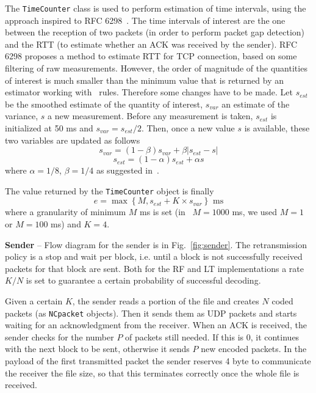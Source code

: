 The \texttt{TimeCounter} class is used to perform estimation of time intervals, using the approach inspired to RFC 6298~\cite{rfc6298}. The time intervals of interest are the one between the reception of two packets (in order to perform packet gap detection) and the RTT (to estimate whether an ACK was received by the sender). RFC 6298 proposes a method to estimate RTT for TCP connection, based on some filtering of raw measurements. However, the order of magnitude of the quantities of interest is much smaller than the minimum value that is returned by an estimator working with~\cite{rfc6298} rules. Therefore some changes have to be made. Let $s_{est}$ be the smoothed estimate of the quantity of interest, $s_{var}$ an estimate of the variance, $s$ a new measurement. Before any measurement is taken, $s_{est}$ is initialized at 50 ms and $s_{var} = s_{est}/2$. Then, once a new value $s$ is available, these two variables are updated as follows
\begin{equation}
	s_{var} = (1-\beta) s_{var}  + \beta |s_{est} - s|
\end{equation}
\begin{equation}
	s_{est} = (1 - \alpha) s_{est} + \alpha s
\end{equation}
where $\alpha = 1/8$, $\beta = 1/4$ as suggested in~\cite{rfc6298}.

The value returned by the \texttt{TimeCounter} object is finally
\begin{equation}
	e = \max\left\{M, s_{est} + K\times s_{var}  \right\} \mbox{ ms}
\end{equation}
where a granularity of minimum $M$ ms is set (in~\cite{rfc6298} $M = 1000$ ms, we used $M = 1$ or $M=100$ ms) and $K = 4$. 

\textbf{Sender} -- Flow diagram for the sender is in Fig.~\ref{fig:sender}. The retransmission policy is a stop and wait per block, i.e. until a block is not successfully received packets for that block are sent. Both for the RF and LT implementations a rate $K/N$ is set to guarantee a certain probability of successful decoding. 

Given a certain $K$, the sender reads a portion of the file and creates $N$ coded packets (as \texttt{NCpacket} objects). Then it sends them as UDP packets and starts waiting for an acknowledgment from the receiver. When an ACK is received, the sender checks for the number $P$ of packets still needed. If this is 0, it continues with the next block to be sent, otherwise it sends $P$ new encoded packets. In the payload of the first transmitted packet the sender reserves 4 byte to communicate the receiver the file size, so that this terminates correctly once the whole file is received. 

